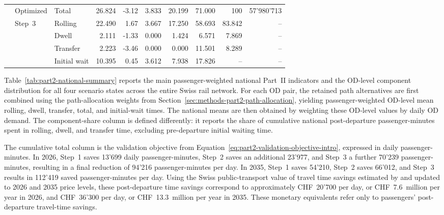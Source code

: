 \documentclass[preprint,12pt]{elsarticle}
\begin{document}
\begin{table}[htbp]
{\begin{tabular}{lllrrrrrrr}
 & Optimized  & Total & 26.824 & -3.12 & 3.833 & 20.199 & 71.000 & 100 & 57'980'713  \\
     &          Step~3        & Rolling & 22.490 & 1.67 & 3.667 & 17.250 & 58.693 & 83.842 & --  \\
     &                  & Dwell & 2.111 & -1.33 & 0.000 & 1.424 & 6.571 & 7.869 & --  \\
     &                  & Transfer & 2.223 & -3.46 & 0.000 & 0.000 & 11.501 & 8.289 & --  \\
     &                  & Initial wait & 10.395 & 0.45 & 3.612 & 7.938 & 17.826 & -- & --  \\

\bottomrule
\end{tabular}%
}
\end{table}

Table~\ref{tab:part2-national-summary} reports the main passenger-weighted national Part~II indicators and the OD-level component distribution for all four scenario states across the entire Swiss rail network. For each OD pair, the retained path alternatives are first combined using the path-allocation weights from Section~\ref{sec:methods-part2-path-allocation}, yielding passenger-weighted OD-level mean rolling, dwell, transfer, total, and initial-wait times. The national means are then obtained by weighting these OD-level values by daily OD demand. The component-share column is defined differently: it reports the share of cumulative national post-departure passenger-minutes spent in rolling, dwell, and transfer time, excluding pre-departure initial waiting time.

The cumulative total column is the validation objective from Equation~\eqref{eq:part2-validation-objective-intro}, expressed in daily passenger-minutes. In 2026, Step~1 saves 13'699 daily passenger-minutes, Step~2 saves an additional 23'977, and Step~3 a further 70'239 passenger-minutes, resulting in a final reduction of 94'216 passenger-minutes per day. In 2035, Step~1 saves 54'210, Step~2 saves 66'012, and Step~3 results in 112'419 saved passenger-minutes per day. Using the Swiss public-transport value of travel time savings estimated by \citet{axhausenEtAl2004SwissVTTS} and updated to 2026 and 2035 price levels, these post-departure time savings correspond to approximately CHF~20'700 per day, or CHF~7.6~million per year in 2026, and CHF~36'300 per day, or CHF~13.3~million per year in 2035. These monetary equivalents refer only to passengers' post-departure travel-time savings.
\end{document}
